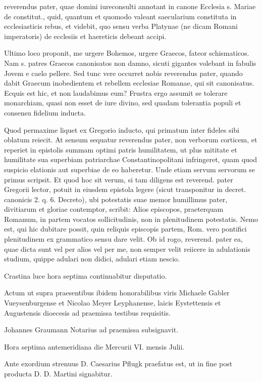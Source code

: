 reverendus pater, quae domini iureconsulti annotant in canone Ecclesia s. Mariae de constitut., quid, quantum et quomodo valeant saecularium constituta in ecclesiasticis rebus, et videbit, quo sensu verba Platynae (ne dicam Romani imperatoris) de ecclesiis et haereticis debeant accipi.

Ultimo loco proponit, me urgere Bohemos, urgere Graecos, fateor schismaticos. Nam s. patres Graecos canonisatos non damno, sicuti gigantes volebant in fabulis Jovem e caelo pellere. Sed tunc vere occurret nobis reverendus pater, quando dabit Graecum inobedientem et rebellem ecclesiae Romanae, qui sit canonisatus. Ecquis est hic, et non laudabimus eum? Frustra ergo assumit se tolerare monarchiam, quasi non esset de iure divino, sed quadam tolerantia populi et consensu fidelium inducta.

Quod permaxime liquet ex Gregorio inducto, qui primatum inter fideles sibi oblatum reiecit. At sensum sequatur reverendus pater, non verborum corticem, et reperiet in epistolis summam optimi patris humilitatem, ut plus mititate et humilitate sua superbiam patriarchae Constantinopolitani infringeret, quam quod suspicio elationis aut superbiae de eo haberetur. Unde etiam servum servorum se primus scripsit. Et quod hoc sit verum, si tam diligens est reverend. pater Gregorii lector, potuit in eiusdem epistola legere (sicut transponitur in decret. canonicis 2. q. 6. Decreto), ubi potestatis suae memor humillimus pater, divitiarum et gloriae contemptor, scribit: Alios episcopos, praeterquam Romanum, in partem vocatos sollicitudinis, non in plenitudinem potestatis. Nemo est, qui hic dubitare possit, quin reliquis episcopis partem, Rom. vero pontifici plenitudinem \marginpar{\small[285]} ex grammatico sensu dare velit. Ob id rogo, reverend. pater ea, quae dicta sunt vel per alios vel per me, non semper velit reiicere in adulationis studium, quippe adulari non didici, adulari etiam nescio.

Crastina luce hora septima continuabitur disputatio.

Actum ut supra praesentibus ibidem honorabilibus viris Michaele Gabler Vueysenburgense et Nicolao Meyer Leyphanense, laicis Eystettensis et Augustensis dioecesis ad praemissa testibus requisitis.

Johannes Graumann Notarius ad praemissa subsignavit.

Hora septima antemeridiana die Mercurii VI. mensis Julii.

Ante exordium strenuus D. Caesarius Pflugk praefatus est, ut in fine post producta D. D. Martini signabitur.

